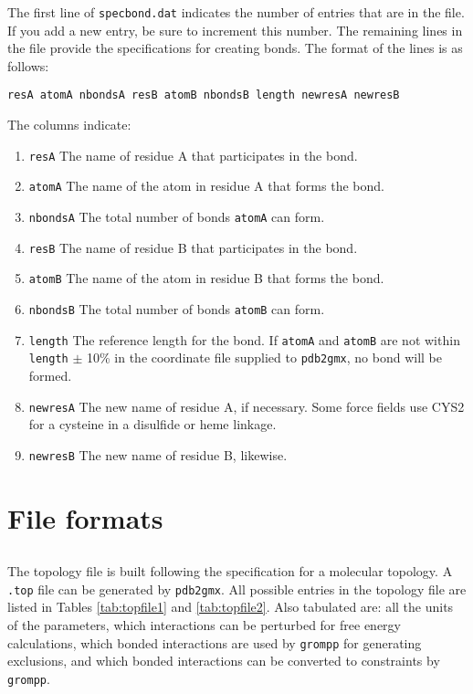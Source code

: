 The first line of {\tt specbond.dat} indicates the number of entries that are in the file. If you
add a new entry, be sure to increment this number. The remaining lines in the file provide the
specifications for creating bonds. The format of the lines is as follows:

{\tt resA  atomA  nbondsA  resB  atomB  nbondsB  length  newresA  newresB }

The columns indicate:
\begin{enumerate}
\item {\tt resA} The name of residue A that participates in the bond.
\item {\tt atomA} The name of the atom in residue A that forms the bond.
\item {\tt nbondsA} The total number of bonds {\tt atomA} can form.
\item {\tt resB} The name of residue B that participates in the bond.
\item {\tt atomB} The name of the atom in residue B that forms the bond.
\item {\tt nbondsB} The total number of bonds {\tt atomB} can form.
\item {\tt length} The reference length for the bond. If {\tt atomA} and {\tt atomB} are not within
{\tt length} $\pm$ 10\% in the coordinate file supplied to {\tt pdb2gmx}, no bond will be formed.
\item {\tt newresA} The new name of residue A, if necessary. Some force fields use {\eg} CYS2 for 
a cysteine in a disulfide or heme linkage.
\item {\tt newresB} The new name of residue B, likewise.
\end{enumerate}


\section{File formats}
\subsection{}
\label{subsec:topfile}
The topology file is built following the {\gromacs} specification for a
molecular topology.  A {\tt *.top} file can be generated by
{\tt pdb2gmx}.
All possible entries in the topology file are listed in
Tables \ref{tab:topfile1} and \ref{tab:topfile2}.
Also tabulated are: all the units
of the parameters, which interactions can be perturbed for free energy
calculations, which bonded interactions are used by {\tt grompp}
for generating exclusions, and which bonded interactions can be converted
to constraints by {\tt grompp}.

